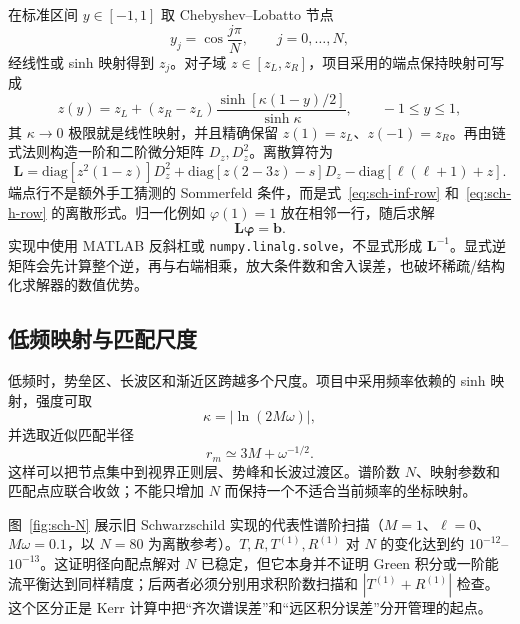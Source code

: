 \documentclass[UTF8,fontset=fandol,11pt,a4paper,oneside]{ctexart}
\numberwithin{equation}{section}
\newcommand{\abs}[1]{\left|#1\right|}
\begin{document}
在标准区间 $y\in[-1,\allowbreak 1]$ 取 Chebyshev--Lobatto 节点
\begin{equation}
y_j=\cos\frac{j\pi}{N},\qquad j=0,\ldots,N,
\end{equation}
经线性或 sinh 映射得到 $z_j$。对子域 $z\in[z_L,\allowbreak z_R]$，项目采用的端点保持映射可写成
\begin{equation}
z(y)=z_L+(z_R-z_L)
\frac{\sinh[\kappa(1-y)/2]}{\sinh\kappa},
\qquad -1\le y\le1,
\label{eq:sinh-map}
\end{equation}
其 $\kappa\to0$ 极限就是线性映射，并且精确保留 $z(1)=z_L$、$z(-1)=z_R$。再由链式法则构造一阶和二阶微分矩阵 $D_z,\allowbreak D_z^2$。离散算符为
\begin{equation}
\bm L=\bm{\mathrm{diag}}[z^2(1-z)]D_z^2
+\bm{\mathrm{diag}}[z(2-3z)-s]D_z
-\bm{\mathrm{diag}}[\ell(\ell+1)+z].
\end{equation}
端点行不是额外手工猜测的 Sommerfeld 条件，而是式~\eqref{eq:sch-inf-row} 和~\eqref{eq:sch-h-row} 的离散形式。归一化例如 $\varphi(1)=1$ 放在相邻一行，随后求解
\begin{equation}
\bm L\bm\varphi=\bm b.
\end{equation}
实现中使用 MATLAB 反斜杠或 \texttt{numpy.linalg.solve}，不显式形成 $\bm L^{-1}$。显式逆矩阵会先计算整个逆，再与右端相乘，放大条件数和舍入误差，也破坏稀疏/结构化求解器的数值优势。

\subsection{低频映射与匹配尺度}

低频时，势垒区、长波区和渐近区跨越多个尺度。项目中采用频率依赖的 sinh 映射，强度可取
\begin{equation}
\kappa=\abs{\ln(2M\omega)},
\end{equation}
并选取近似匹配半径
\begin{equation}
r_m\simeq 3M+\omega^{-1/2}.
\end{equation}
这样可以把节点集中到视界正则层、势峰和长波过渡区。谱阶数 $N$、映射参数和匹配点应联合收敛；不能只增加 $N$ 而保持一个不适合当前频率的坐标映射。

图~\ref{fig:sch-N} 展示旧 Schwarzschild 实现的代表性谱阶扫描（$M=1$、$\ell=0$、$M\omega=0.1$，以 $N=80$ 为离散参考）。$T,\allowbreak R,\allowbreak T^{(1)},\allowbreak R^{(1)}$ 对 $N$ 的变化达到约 $10^{-12}$--$10^{-13}$。这证明径向配点解对 $N$ 已稳定，但它本身并不证明 Green 积分或一阶能流平衡达到同样精度；后两者必须分别用求积阶数扫描和 $\abs{T^{(1)}+R^{(1)}}$ 检查。这个区分正是 Kerr 计算中把“齐次谱误差”和“远区积分误差”分开管理的起点。
\end{document}
